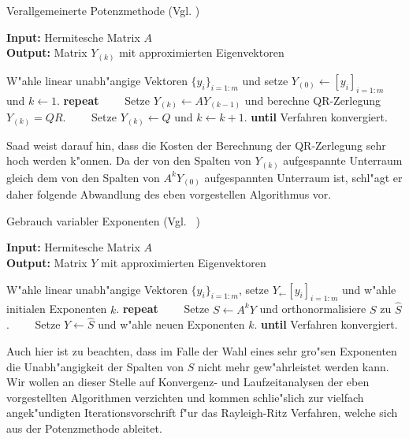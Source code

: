 \begin{algorithm}
\caption{Verallgemeinerte Potenzmethode (Vgl. \cite[Algorithmus 5.1, S. 115]{saad})}\label{alg:chap4:potenzverfahrenMatrix}
\vspace{.15cm}
\textbf{Input:} Hermitesche Matrix $A$\\
\textbf{Output:} Matrix $Y_{(k)}$ mit approximierten Eigenvektoren
\begin{algorithmic}[1]
\State W"ahle linear unabh"angige Vektoren $\{y_i\}_{i=1:m}$ und setze $Y_{(0)}\gets[y_i]_{i=1:m}$ und $k\gets 1$.
\State \textbf{repeat}
\State \ \ \ \ Setze $Y_{(k)} \gets AY_{(k-1)}$ und berechne QR-Zerlegung $Y_{(k)} = QR$.
\State \ \ \ \ Setze $Y_{(k)} \gets Q$ und $k\gets k+1$.
\State \textbf{until} Verfahren konvergiert.
\end{algorithmic}
\end{algorithm}

Saad weist darauf hin, dass die Kosten der Berechnung der QR-Zerlegung sehr hoch werden k"onnen. Da der von den Spalten von $Y_{(k)}$ aufgespannte Unterraum gleich dem von den Spalten von $A^k Y_{(0)}$ aufgespannten Unterraum ist, schl"agt er daher folgende Abwandlung des eben vorgestellen Algorithmus vor.

\begin{algorithm}
\caption{Gebrauch variabler Exponenten (Vgl. ~\cite[Algorithmus 5.2, S. 116]{saad})}\label{alg:chap4:potentePotenz}
\vspace{.15cm}
\textbf{Input:} Hermitesche Matrix $A$\\
\textbf{Output:} Matrix $Y$ mit approximierten Eigenvektoren
\begin{algorithmic}[1]
\State W"ahle linear unabh"angige Vektoren $\{y_i\}_{i=1:m}$, setze $Y_\gets[y_i]_{i=1:m}$ und w"ahle initialen Exponenten $k$.
\State \textbf{repeat}
\State \ \ \ \ Setze $S \gets A^kY$ und orthonormalisiere $S$ zu $\widehat{S}$.
\State \ \ \ \ Setze $Y \gets \widehat{S}$ und w"ahle neuen Exponenten $k$.
\State \textbf{until} Verfahren konvergiert.
\end{algorithmic}
\end{algorithm}

\newpage

Auch hier ist zu beachten, dass im Falle der Wahl eines sehr gro"sen Exponenten die Unabh"angigkeit der Spalten von $S$ nicht mehr gew"ahrleistet werden kann.
Wir wollen an dieser Stelle auf Konvergenz- und Laufzeitanalysen der eben vorgestellten Algorithmen verzichten und kommen schlie"slich zur vielfach angek"undigten Iterationsvorschrift f"ur das Rayleigh-Ritz Verfahren, welche sich aus der Potenzmethode ableitet.


